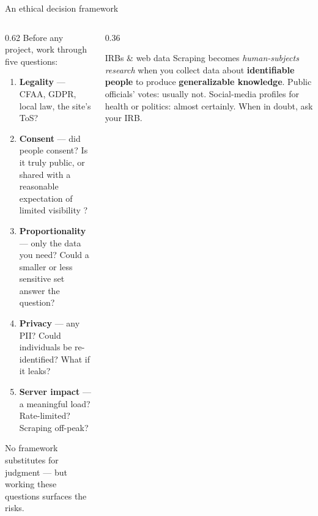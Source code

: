 \documentclass[9pt,aspectratio=169]{beamer}
\begin{document}
\begin{frame}{An ethical decision framework}
    \begin{columns}[T]
        \begin{column}{0.62\textwidth}
            Before any project, work through five questions:
            \begin{enumerate}\small
                \item \textcolor{tab-blue}{\textbf{Legality}} --- CFAA, GDPR, local law, the site's ToS?
                \item \textcolor{tab-green}{\textbf{Consent}} --- did people consent? Is it truly public, or shared with a reasonable expectation of limited visibility \parencite{zimmer_DataAlreadyPublic_2010}?
                \item \textcolor{tab-orange}{\textbf{Proportionality}} --- only the data you need? Could a smaller or less sensitive set answer the question?
                \item \textcolor{tab-purple}{\textbf{Privacy}} --- any PII? Could individuals be re-identified? What if it leaks?
                \item \textcolor{tab-red}{\textbf{Server impact}} --- a meaningful load? Rate-limited? Scraping off-peak?
            \end{enumerate}
            \vspace{0.2em}
            {\footnotesize No framework substitutes for judgment --- but working these questions surfaces the risks.}
        \end{column}
        \begin{column}{0.36\textwidth}
            \begin{block}{IRBs \& web data}
                \footnotesize Scraping becomes \textit{human-subjects research} when you collect data about \textbf{identifiable people} to produce \textbf{generalizable knowledge}. Public officials' votes: usually not. Social-media profiles for health or politics: almost certainly. When in doubt, ask your IRB.
            \end{block}
        \end{column}
    \end{columns}
\end{frame}

\end{document}
